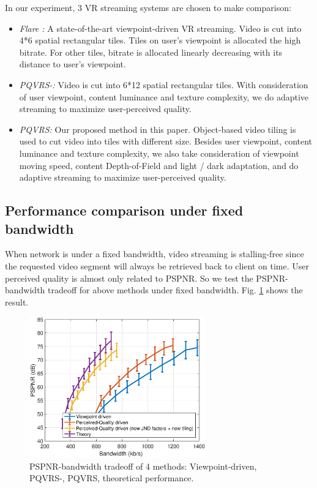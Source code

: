 In our experiment, 3 VR streaming systems are chosen to make comparison:

\begin{itemize}

\item \emph{Flare \cite{Flare}:} A state-of-the-art viewpoint-driven VR streaming. Video is cut into 4*6 spatial rectangular tiles. Tiles on user's viewpoint is allocated the high bitrate. For other tiles, bitrate is allocated linearly decreasing with its distance to user's viewpoint.

\item \emph{PQVRS-:} Video is cut into 6*12 spatial rectangular tiles. With consideration of user viewpoint, content luminance and texture complexity, we do adaptive streaming to maximize user-perceived quality.

\item \emph{PQVRS:} Our proposed method in this paper. Object-based video tiling is used to cut video into tiles with different size. Besides user viewpoint, content luminance and texture complexity, we also take consideration of viewpoint moving speed, content Depth-of-Field and light / dark adaptation, and do adaptive streaming to maximize user-perceived quality.

\end{itemize}

\subsection{Performance comparison under fixed bandwidth}

When network is under a fixed bandwidth, video streaming is stalling-free since the requested video segment will always be retrieved back to client on time. User perceived quality is almost only related to PSPNR. So we test the PSPNR-bandwidth tradeoff for above methods under fixed bandwidth. Fig. \ref{practical_imp} shows the result.

  \begin{figure}
  \centering
  \includegraphics[width=3in]{images/practical_improvement.eps}
  \caption{PSPNR-bandwidth tradeoff of 4 methods: Viewpoint-driven, PQVRS-, PQVRS, theoretical performance.}
  \label{practical_imp}
  \end{figure}


